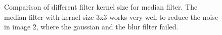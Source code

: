 \documentclass[11pt,a4paper]{article}
\begin{document}
\begin{figure}
\quad
{}
\quad
{}
\quad

\caption{Comparison of different filter kernel size for median filter. The median filter with kernel size 3x3 works very well to reduce the noise in image 2, where the gaussian and the blur filter failed.}%
\label{fig:mblur}%
\end{figure}
\end{document}
